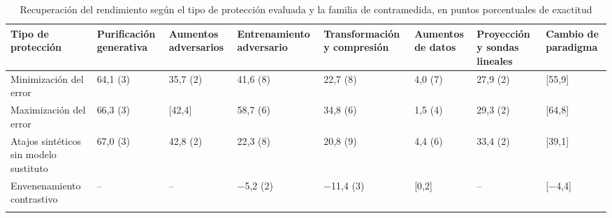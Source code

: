 \begin{table}[t]
\caption{Recuperación del rendimiento según el tipo de protección evaluada y la familia de contramedida, en puntos porcentuales de exactitud}\label{tab:matriz}
\footnotesize
\begin{tabularx}{\textwidth}{@{}L{3.0cm}*{7}{Z{1.0}}@{}}
\toprule
Tipo de protección & Purificación generativa & Aumentos adversarios & Entrenamiento adversario & Transformación y compresión & Aumentos de datos & Proyección y sondas lineales & Cambio de paradigma \\
\midrule
Minimización del error & 64,1 (3) & 35,7 (2) & 41,6 (8) & 22,7 (8) & 4,0 (7) & 27,9 (2) & [55,9] \\
Maximización del error & 66,3 (3) & [42,4] & 58,7 (6) & 34,8 (6) & 1,5 (4) & 29,3 (2) & [64,8] \\
Atajos sintéticos sin modelo sustituto & 67,0 (3) & 42,8 (2) & 22,3 (8) & 20,8 (9) & 4,4 (6) & 33,4 (2) & [39,1] \\
Envenenamiento contrastivo & -- & -- & $-$5,2 (2) & $-$11,4 (3) & [0,2] & -- & [$-$4,4] \\
\botrule
\end{tabularx}
\end{table}
